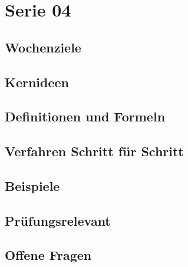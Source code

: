 \chapter{Serie 04}
\label{kap:serie04}

\section*{Wochenziele}
\begin{wochenziele}
\end{wochenziele}

\section{Kernideen}

\section{Definitionen und Formeln}

\section{Verfahren Schritt für Schritt}

\section{Beispiele}

\section{Prüfungsrelevant}

\section{Offene Fragen}

